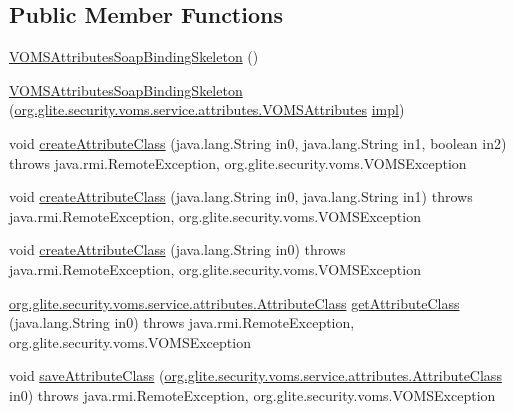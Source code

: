 \subsection*{Public Member Functions}
\begin{DoxyCompactItemize}
\item 
\hyperlink{classorg_1_1glite_1_1security_1_1voms_1_1service_1_1attributes_1_1VOMSAttributesSoapBindingSkeleton_af5bfa69f1e00d4085dbc6a831fadfb91}{VOMSAttributesSoapBindingSkeleton} ()
\item 
\hyperlink{classorg_1_1glite_1_1security_1_1voms_1_1service_1_1attributes_1_1VOMSAttributesSoapBindingSkeleton_a7e803371559b00537c16c00f1fa8253a}{VOMSAttributesSoapBindingSkeleton} (\hyperlink{interfaceorg_1_1glite_1_1security_1_1voms_1_1service_1_1attributes_1_1VOMSAttributes}{org.glite.security.voms.service.attributes.VOMSAttributes} \hyperlink{classorg_1_1glite_1_1security_1_1voms_1_1service_1_1attributes_1_1VOMSAttributesSoapBindingSkeleton_a21e3c265df9eb028b0565ed1ed449a85}{impl})
\item 
void \hyperlink{classorg_1_1glite_1_1security_1_1voms_1_1service_1_1attributes_1_1VOMSAttributesSoapBindingSkeleton_a4f892d85b75dbfe73809e40274702b4e}{createAttributeClass} (java.lang.String in0, java.lang.String in1, boolean in2)  throws java.rmi.RemoteException, org.glite.security.voms.VOMSException     
\item 
void \hyperlink{classorg_1_1glite_1_1security_1_1voms_1_1service_1_1attributes_1_1VOMSAttributesSoapBindingSkeleton_aa07a85c09bfd6df5e46116890ed1fe60}{createAttributeClass} (java.lang.String in0, java.lang.String in1)  throws java.rmi.RemoteException, org.glite.security.voms.VOMSException     
\item 
void \hyperlink{classorg_1_1glite_1_1security_1_1voms_1_1service_1_1attributes_1_1VOMSAttributesSoapBindingSkeleton_a9bcc9983a1c3e6e54c27bc832decaa16}{createAttributeClass} (java.lang.String in0)  throws java.rmi.RemoteException, org.glite.security.voms.VOMSException     
\item 
\hyperlink{classorg_1_1glite_1_1security_1_1voms_1_1service_1_1attributes_1_1AttributeClass}{org.glite.security.voms.service.attributes.AttributeClass} \hyperlink{classorg_1_1glite_1_1security_1_1voms_1_1service_1_1attributes_1_1VOMSAttributesSoapBindingSkeleton_abc0e9a3e03317219cca370ba1217802e}{getAttributeClass} (java.lang.String in0)  throws java.rmi.RemoteException, org.glite.security.voms.VOMSException     
\item 
void \hyperlink{classorg_1_1glite_1_1security_1_1voms_1_1service_1_1attributes_1_1VOMSAttributesSoapBindingSkeleton_a7c97fc0456f9dcb5467197d54f414cb0}{saveAttributeClass} (\hyperlink{classorg_1_1glite_1_1security_1_1voms_1_1service_1_1attributes_1_1AttributeClass}{org.glite.security.voms.service.attributes.AttributeClass} in0)  throws java.rmi.RemoteException, org.glite.security.voms.VOMSException     

\end{DoxyCompactItemize}
